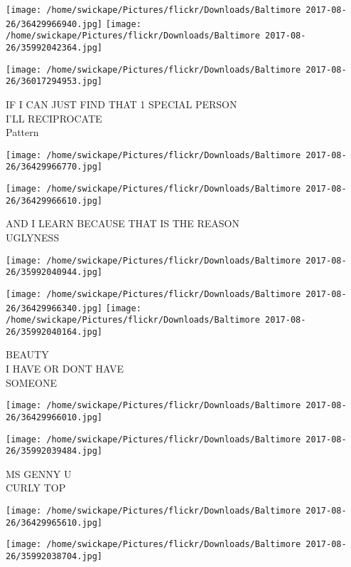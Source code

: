 \documentclass[10pt,letterpaper]{article}
\begin{document}
\texttt{[image: /home/swickape/Pictures/flickr/Downloads/Baltimore 2017-08-26/36429966940.jpg]}
\texttt{[image: /home/swickape/Pictures/flickr/Downloads/Baltimore 2017-08-26/35992042364.jpg]}

\texttt{[image: /home/swickape/Pictures/flickr/Downloads/Baltimore 2017-08-26/36017294953.jpg]}

IF I CAN JUST FIND THAT 1 SPECIAL PERSON\\
I'LL RECIPROCATE\\
Pattern
\pagebreak

\texttt{[image: /home/swickape/Pictures/flickr/Downloads/Baltimore 2017-08-26/36429966770.jpg]}

\vspace{0.25in}
\texttt{[image: /home/swickape/Pictures/flickr/Downloads/Baltimore 2017-08-26/36429966610.jpg]}

AND I LEARN BECAUSE THAT IS THE REASON\\
UGLYNESS
\pagebreak

\texttt{[image: /home/swickape/Pictures/flickr/Downloads/Baltimore 2017-08-26/35992040944.jpg]}

\vspace{0.25in}
\texttt{[image: /home/swickape/Pictures/flickr/Downloads/Baltimore 2017-08-26/36429966340.jpg]}
\texttt{[image: /home/swickape/Pictures/flickr/Downloads/Baltimore 2017-08-26/35992040164.jpg]}

BEAUTY\\
I HAVE OR DONT HAVE\\
SOMEONE
\pagebreak

\texttt{[image: /home/swickape/Pictures/flickr/Downloads/Baltimore 2017-08-26/36429966010.jpg]}

\vspace{0.25in}
\texttt{[image: /home/swickape/Pictures/flickr/Downloads/Baltimore 2017-08-26/35992039484.jpg]}

MS GENNY U\\
CURLY TOP
\pagebreak

\texttt{[image: /home/swickape/Pictures/flickr/Downloads/Baltimore 2017-08-26/36429965610.jpg]}

\vspace{0.25in}
\texttt{[image: /home/swickape/Pictures/flickr/Downloads/Baltimore 2017-08-26/35992038704.jpg]}
\end{document}
